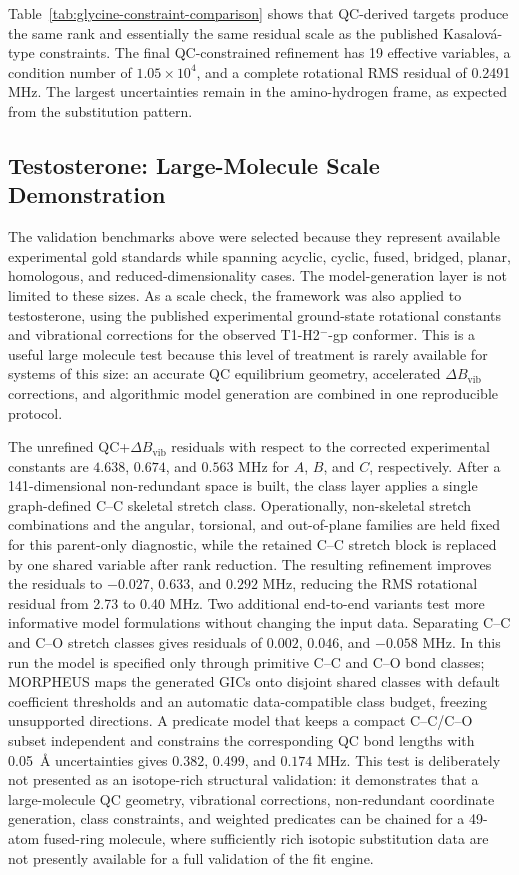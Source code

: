 \documentclass[aip,jcp,reprint,longbibliography,floatfix]{revtex4-2}
\begin{document}
Table~\ref{tab:glycine-constraint-comparison} shows that QC-derived targets
produce the same rank and essentially the same residual scale as the published
Kasalov{\'a}-type constraints. The final QC-constrained refinement has 19
effective variables, a condition number of $1.05\times10^4$, and a complete
rotational RMS residual of 0.2491 MHz. The largest uncertainties remain in the
amino-hydrogen frame, as expected from the substitution pattern.

\subsection{Testosterone: Large-Molecule Scale Demonstration}

The validation benchmarks above were selected because they represent available
experimental gold standards while spanning acyclic, cyclic, fused, bridged,
planar, homologous, and reduced-dimensionality cases. The model-generation
layer is not limited to these sizes. As a scale check, the framework was
also applied to testosterone, using the published experimental ground-state
rotational constants and vibrational corrections for the observed
T1-H2$^{-}$-gp conformer.\cite{Uribe2024SteroidHormones} This is a useful large
molecule test because this level of treatment is rarely available for systems
of this size: an accurate QC equilibrium geometry, accelerated
$\Delta B_\mathrm{vib}$ corrections, and algorithmic model generation are
combined in one reproducible protocol.

The unrefined QC+$\Delta B_\mathrm{vib}$ residuals with respect to the corrected
experimental constants are $4.638$, $0.674$, and $0.563$ MHz for $A$, $B$, and
$C$, respectively. After a 141-dimensional non-redundant space is built, the
class layer applies a single graph-defined C--C skeletal stretch class.
Operationally, non-skeletal stretch combinations and the angular, torsional,
and out-of-plane families are held fixed for this parent-only diagnostic, while
the retained C--C stretch block is replaced by one shared variable after rank
reduction. The resulting refinement improves the residuals to $-0.027$,
$0.633$, and $0.292$ MHz, reducing the RMS rotational residual from 2.73 to
0.40 MHz. Two additional end-to-end variants test more informative model
formulations without changing the input data. Separating C--C and C--O stretch
classes gives residuals of $0.002$, $0.046$, and $-0.058$ MHz. In this run the
model is specified only through primitive C--C and C--O bond classes; MORPHEUS
maps the generated GICs onto disjoint shared classes with default coefficient
thresholds and an automatic data-compatible class budget, freezing unsupported
directions.
A predicate model that keeps a compact C--C/C--O subset independent and
constrains the corresponding QC bond lengths with 0.05~\AA{} uncertainties gives
$0.382$, $0.499$, and $0.174$ MHz. This test is deliberately not presented as an isotope-rich
structural validation: it demonstrates that a large-molecule QC geometry,
vibrational corrections, non-redundant coordinate generation, class constraints,
and weighted predicates can be chained for a 49-atom fused-ring molecule, where
sufficiently rich isotopic substitution data are not presently available for a
full validation of the fit engine.
\end{document}
